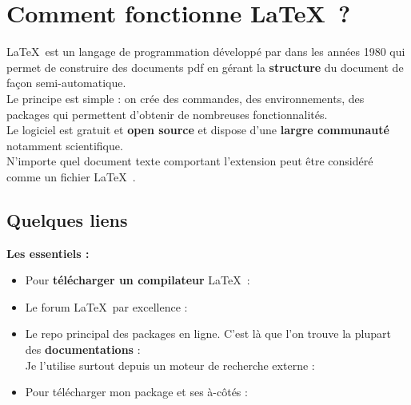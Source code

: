 \documentclass[a4paper,11pt,fleqn]{article}
\begin{document}
\setcounter{pagecounter}{0}
\setcounter{ExoMA}{0}
\setcounter{prof}{1}


\section{Comment fonctionne \LaTeX\  ?}

\LaTeX\  est un langage de programmation développé par  dans les années 1980 qui permet de construire des documents pdf en gérant la \textbf{structure} du document de façon semi-automatique.\\

Le principe est simple : on crée des commandes, des environnements, des packages qui permettent d'obtenir de nombreuses fonctionnalités.\\

Le logiciel est gratuit et \textbf{open source} et dispose d'une \textbf{largre communauté} notamment scientifique. \\

N'importe quel document texte comportant l'extension  peut être considéré comme un fichier \LaTeX\ . \\

\subsection{Quelques liens}

\textbf{Les essentiels :}\\
\begin{itemize}[label = \bccrayon]
	\item Pour \textbf{télécharger un compilateur} \LaTeX\  : 
	\item Le forum \LaTeX\  par excellence : 
	\item Le repo principal des packages en ligne. C'est là que l'on trouve la plupart des \textbf{documentations} : \\
		Je l'utilise surtout depuis un moteur de recherche externe : 
	\item Pour télécharger mon package  et ses à-côtés : 
\end{itemize}
\end{document}
